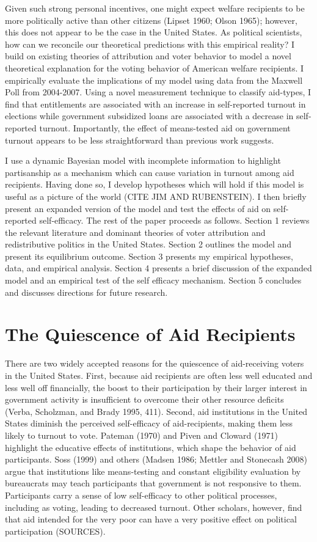 \documentclass[12pt]{paper}
\begin{document}
Given such strong personal incentives, one might expect welfare recipients to be more politically active than other citizens (Lipset 1960; Olson 1965); however, this does not appear to be the case in the United States. As political scientists, how can we reconcile our theoretical predictions with this empirical reality? I build on existing theories of attribution and voter behavior to model a novel theoretical explanation for the voting behavior of American welfare recipients. I empirically evaluate the implications of my model using data from the Maxwell Poll from 2004-2007. Using a novel measurement technique to classify aid-types, I find that entitlements are associated with an increase in self-reported turnout in elections while government subsidized loans are associated with a decrease in self-reported turnout. Importantly, the effect of means-tested aid on government turnout appears to be less straightforward than previous work suggests.

I use a dynamic Bayesian model with incomplete information to highlight partisanship as a mechanism which can cause variation in turnout among aid recipients. Having done so, I develop hypotheses which will hold if this model is useful as a picture of the world (CITE JIM AND RUBENSTEIN). I then briefly present an expanded version of the model and test the effects of aid on self-reported self-efficacy. The rest of the paper proceeds as follows. Section 1 reviews the relevant literature and dominant theories of voter attribution and redistributive politics in the United States. Section 2 outlines the model and present its equilibrium outcome. Section 3 presents my empirical hypotheses, data, and empirical analysis. Section 4 presents a brief discussion of the expanded model and an empirical test of the self efficacy mechanism. Section 5 concludes and discusses directions for future research.

\section{The Quiescence of Aid Recipients}
There are two widely accepted reasons for the quiescence of aid-receiving voters in the United States. First, because aid recipients are often less well educated and less well off financially, the boost to their participation by their larger interest in government activity is insufficient to overcome their other resource deficits (Verba, Scholzman, and Brady 1995, 411). Second, aid institutions in the United States diminish the perceived self-efficacy of aid-recipients, making them less likely to turnout to vote. Pateman (1970) and Piven and Cloward (1971) highlight the educative effects of institutions, which shape the behavior of aid participants. Soss (1999) and others (Madsen 1986; Mettler and Stonecash 2008) argue that institutions like means-testing and constant eligibility evaluation by bureaucrats may teach participants that government is not responsive to them. Participants carry a sense of low self-efficacy to other political processes, including as voting, leading to decreased turnout. Other scholars, however, find that aid intended for the very poor can have a very positive effect on political participation (SOURCES).
\end{document}

